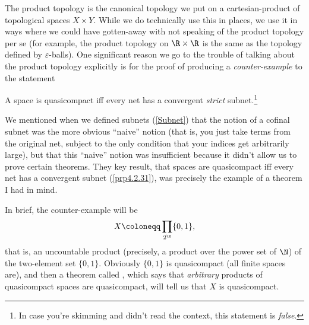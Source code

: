 The product topology is the canonical topology we put on a cartesian-product of topological spaces $X\times Y$.  While we do technically use this in places, we use it in ways where we could have gotten-away with not speaking of the product topology per se (for example, the product topology on $\R \times \R$ is the same as the topology defined by $\varepsilon$-balls).  One significant reason we go to the trouble of talking about the product topology explicitly is for the proof of producing a \emph{counter-example} to the statement
\begin{displayquote}
A space is quasicompact iff every net has a convergent \emph{strict} subnet.\footnote{In case you're skimming and didn't read the context, this statement is \emph{false}.}
\end{displayquote}
We mentioned when we defined subnets (\cref{Subnet}) that the notion of a cofinal subnet was the more obvious ``naive'' notion (that is, you just take terms from the original net, subject to the only condition that your indices get arbitrarily large), but that this ``naive'' notion was insufficient because it didn't allow us to prove certain theorems.  They key result, that spaces are quasicompact iff every net has a convergent subnet (\cref{prp4.2.31}), was precisely the example of a theorem I had in mind.

In brief, the counter-example will be
\begin{equation}
X\coloneqq \prod _{2^{\N}}\{ 0,1\} ,
\end{equation}
that is, an uncountable product (precisely, a product over the power set of $\N$) of the two-element set $\{ 0,1\}$.  Obviously $\{ 0,1\}$ is quasicompact (all finite spaces are), and then a theorem called , which says that \emph{arbitrary} products of quasicompact spaces are quasicompact, will tell us that $X$ is quasicompact.

